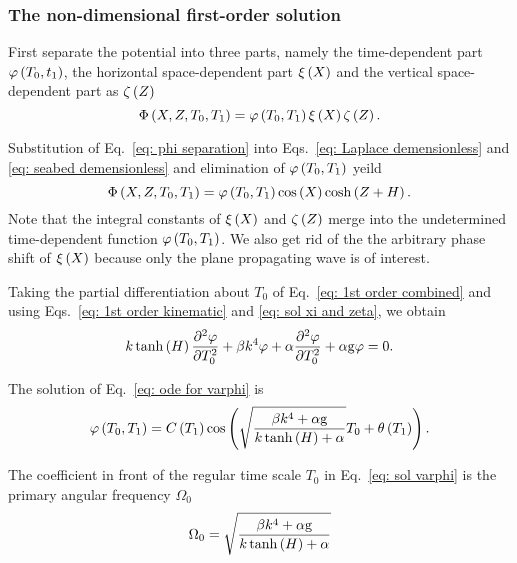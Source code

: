\subsubsection{The non-dimensional first-order solution}
First separate the potential into three parts, namely the time-dependent part \ensuremath{\varphi\bkt{T_0,t_1}}, the horizontal space-dependent part \ensuremath{\xi\bkt{X}} and the vertical space-dependent part as \ensuremath{\zeta\bkt{Z}}
\begin{equation}
    \Phi\left(X,Z,T_0,T_1\right) = \varphi\left(T_0,T_1\right) \xi\left(X\right) \zeta\left(Z\right).
    \label{eq: phi separation}
\end{equation}

Substitution of Eq.~\eqref{eq: phi separation} into Eqs.~\eqref{eq: Laplace demensionless} and \eqref{eq: seabed demensionless} and elimination of \ensuremath{\varphi\bkt{T_0,T_1}} yeild
\begin{equation}
    \Phi\left(X,Z,T_0,T_1\right) = \varphi\left(T_0,T_1\right)  \cos \left( X \right) \cosh\left(Z+H\right).
    \label{eq: sol xi and zeta}
\end{equation}
Note that the integral constants of \ensuremath{\xi\bkt{X}} and \ensuremath{\zeta\bkt{Z}} merge into the undetermined time-dependent function \ensuremath{\varphi\bkt{T_0,T_1}}. We also get rid of the the arbitrary phase shift of \ensuremath{\xi\bkt{X}} because only the plane propagating wave is of interest. 

Taking the partial differentiation about \ensuremath{T_0} of Eq.~\eqref{eq: 1st order combined} and using Eqs.~\eqref{eq: 1st order kinematic} and \eqref{eq: sol xi and zeta}, we obtain
\begin{equation}
    k \tanh\left(H\right) \pdv[2]{\varphi}{T_0} + \beta k^4 \varphi + \alpha \pdv[2]{\varphi}{T_0} + \alpha \mathrm{g} \varphi = 0.
    \label{eq: ode for varphi}
\end{equation}

The solution of Eq.~\eqref{eq: ode for varphi} is
\begin{equation}
    \varphi \left(T_0,T_1\right)
    = 
    C\left(T_1\right)
    \cos \left( 
    \sqrt{\frac{ \beta k^4 + \alpha \mathrm{g} }{ k \tanh\left(H\right) + \alpha }} T_0 
    + \theta\left(T_1\right)
    \right).
    \label{eq: sol varphi}
\end{equation}

The coefficient in front of the regular time scale \ensuremath{T_0} in Eq.~\eqref{eq: sol varphi} is the primary angular frequency \ensuremath{\Omega_0}
\begin{equation}
    \Omega_0 = \sqrt{ \frac{ \beta k^4 + \alpha \mathrm{g} }{ k \tanh\left(H\right) + \alpha } }
    \label{eq: linear DR}
\end{equation}

